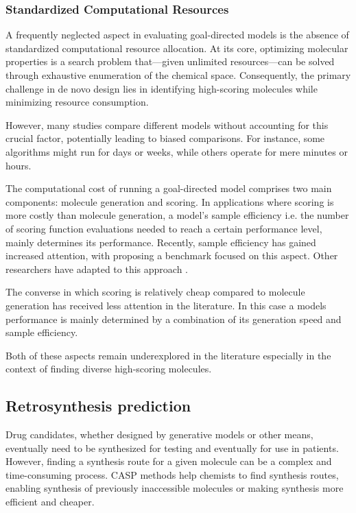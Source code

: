 \subsubsection{Standardized Computational Resources}
A frequently neglected aspect in evaluating goal-directed models is the absence of standardized
computational resource allocation. At its core, optimizing molecular properties is a search problem
that—given unlimited resources—can be solved through exhaustive enumeration of the chemical space.
Consequently, the primary challenge in de novo design lies in identifying high-scoring molecules
while minimizing resource consumption.

However, many studies compare different models without
accounting for this crucial factor, potentially leading to biased comparisons. For instance, some
algorithms might run for days or weeks, while others operate for mere minutes or hours.

The computational cost of running a goal-directed model comprises two main components: molecule
generation and scoring. In applications where scoring is more costly than molecule generation, a
model's sample efficiency i.e. the number of scoring function evaluations needed to reach a certain
performance level, mainly determines its performance. Recently, sample efficiency has gained
increased attention, with \citep{gaoSampleEfficiencyMatters2022} proposing a benchmark focused on
this aspect. Other researchers have adapted to this approach
\citep{thomasReevaluatingSampleEfficiency2022,thomasAugmentedHillClimbIncreases2022,guoAugmentedMemoryCapitalizing2023}.

The converse in which scoring is relatively cheap compared to molecule generation
has received less attention in the literature. In this case a models performance
is mainly determined by a combination of its generation speed and sample efficiency.

Both of these aspects remain underexplored in the literature especially in the context of
finding diverse high-scoring molecules.

\subsection{Retrosynthesis prediction}
Drug candidates, whether designed by generative models or other means, eventually need to be
synthesized for testing and eventually for use in patients. However, finding a synthesis route for a
given molecule can be a complex and time-consuming process. \Ac{CASP} methods help
chemists to find synthesis routes, enabling synthesis of previously inaccessible molecules or making
synthesis more efficient and cheaper.

